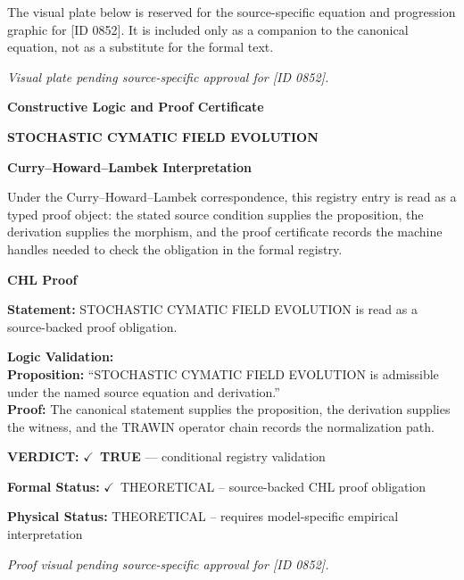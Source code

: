 \begingroup\footnotesize\sloppy
The visual plate below is reserved for the source-specific equation and progression graphic for [ID 0852]. It is included only as a companion to the canonical equation, not as a substitute for the formal text.
\par\endgroup
\begingroup\footnotesize\itshape
Visual plate pending source-specific approval for [ID 0852].
\par\endgroup

\clearpage
\begingroup\tzpsupportsetup
\noindent\textbf{\fontsize{10.8pt}{12.8pt}\selectfont [ID 0852] Constructive Logic and Proof Certificate}\par
\noindent\textbf{\fontsize{10pt}{12pt}\selectfont STOCHASTIC CYMATIC FIELD EVOLUTION}\par
\vspace{0.45em}
\begingroup
\footnotesize
\setlength{\parskip}{0.22em}
\setlength{\parindent}{0pt}
\noindent\textbf{Curry--Howard--Lambek Interpretation}\par
Under the Curry--Howard--Lambek correspondence, this registry entry is read as a typed proof
object: the stated source condition supplies the proposition, the derivation supplies the
morphism, and the proof certificate records the machine handles needed to check the obligation
in the formal registry.

\vspace{0.45em}
\noindent\textbf{CHL Proof}\par
\textbf{Statement:} STOCHASTIC CYMATIC FIELD EVOLUTION is read as a source-backed proof obligation.

\textbf{Logic Validation:}\\
\textbf{Proposition:} ``STOCHASTIC CYMATIC FIELD EVOLUTION is admissible under the named source equation and derivation.''\\
\textbf{Proof:} The canonical statement supplies the proposition, the derivation supplies the witness, and the TRAWIN operator chain records the normalization path.

\textbf{VERDICT:} \ensuremath{\checkmark}\ \textbf{TRUE} --- conditional registry validation

\textbf{Formal Status:} \ensuremath{\checkmark}\ THEORETICAL -- source-backed CHL proof obligation

\textbf{Physical Status:} THEORETICAL -- requires model-specific empirical interpretation
\par\vspace{0.45em}
\par
\vfill
\begingroup\footnotesize\itshape
Proof visual pending source-specific approval for [ID 0852].
\par\endgroup
\vfill
\endgroup
\endgroup
